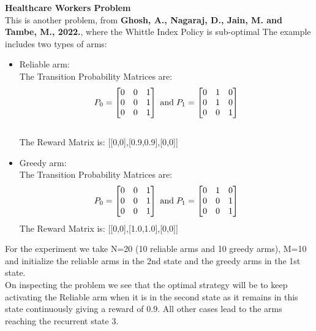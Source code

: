 \documentclass{slides}
\begin{document}
{{\begin{center}
\end{center}
\newpage
\textbf{Healthcare Workers Problem}\\
This is another problem, from \textbf{Ghosh, A., Nagaraj, D., Jain, M. and Tambe, M., 2022.}, where the Whittle Index Policy is sub-optimal
The example includes two types of arms:
\begin{itemize}
\vspace{-2cm}
    \item Reliable arm:\\
    The Transition Probability Matrices are:\\
    \begin{align*}
    P_0=
    \begin{bmatrix}
    0 & 0 & 1\\
    0 & 0 & 1\\
    0 & 0 & 1
    \end{bmatrix}
    \hspace{1mm} \text{and} \hspace{1mm}
    P_1=
    \begin{bmatrix}
    0& 1 & 0\\
    0 & 1 & 0\\
    0 & 0&1
    \end{bmatrix}
    \end{align*}\\
    The Reward Matrix is: [[0,0],[0.9,0.9],[0,0]]
    \newpage
    \item Greedy arm:\\
    The Transition Probability Matrices are:\\
    \begin{align*}
    P_0=
    \begin{bmatrix}
    0 & 0 & 1\\
    0 & 0 & 1\\
    0 & 0 & 1
    \end{bmatrix}
    \hspace{1mm} \text{and} \hspace{1mm}
    P_1=
    \begin{bmatrix}
    0& 1 & 0\\
    0 & 0 & 1\\
    0 & 0&1
    \end{bmatrix}
    \end{align*}
    The Reward Matrix is: [[0,0],[1.0,1.0],[0,0]]
\end{itemize}
For the experiment we take N=20 (10 reliable arms and 10 greedy arms), M=10 and initialize the reliable arms in the 2nd state and the greedy arms in the 1st state.\\
\newpage
On inspecting the problem we see that the optimal strategy will be to keep activating the Reliable arm when it is in the second state as it remains in this state continuously giving a reward of 0.9. All other cases lead to the arms reaching the recurrent state 3.\\
\begin{center}
    

\end{center}}}
\end{document}
